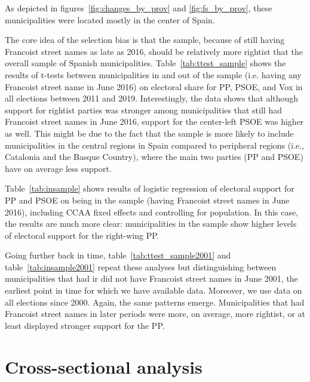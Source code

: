 \documentclass[12pt, titlepage]{article}
\begin{document}
As depicted in  figures~\ref{fig:changes_by_prov} and \ref{fig:fs_by_prov}, these municipalities were located mostly in the center of Spain.

The core idea of the selection bias is that the sample, because of still having Francoist street names as late as 2016, should be relatively more rightist that the overall sample of Spanish municipalities.
Table~\ref{tab:ttest_sample} shows the results of t-tests between municipalities in and out of the sample (i.e. having any Francoist street name in June 2016) on electoral share for PP, PSOE, and Vox in all elections between 2011 and 2019.
Interestingly, the data shows that although support for rightist parties was stronger among municipalities that still had Francoist street names in June 2016, support for the center-left PSOE was higher as well. This might be due to the fact that the sample is more likely to include municipalities in the central regions in Spain compared to peripheral regions (i.e., Catalonia and the Basque Country), where the main two parties (PP and PSOE) have on average less support.



Table~\ref{tab:insample} shows results of logistic regression of electoral support for PP and PSOE on being in the sample (having Francoist street names in June 2016), including CCAA fixed effects and controlling for population.
In this case, the results are much more clear: municipalities in the sample show higher levels of electoral support for the right-wing PP.



Going further back in time, table~\ref{tab:ttest_sample2001} and table~\ref{tab:insample2001} repeat these analyses but distinguishing between municipalities that had ir did not have Francoist street names in June 2001, the earliest point in time for which we have available data.
Moreover, we use data on all elections since 2000.
Again, the same patterns emerge.
Municipalities that had Francoist street names in later periods were more, on average, more rightist, or at least displayed stronger support for the PP.




\clearpage
\section{Cross-sectional analysis}\label{app:crosssec}
\end{document}
